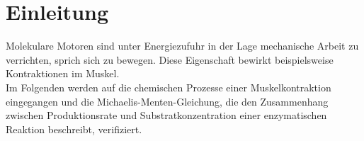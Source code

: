 \section{Einleitung}
Molekulare Motoren sind unter Energiezufuhr in der Lage mechanische Arbeit zu verrichten, sprich sich zu bewegen. Diese Eigenschaft bewirkt beispielsweise Kontraktionen im Muskel. \\
Im Folgenden werden auf die chemischen Prozesse einer Muskelkontraktion eingegangen und die Michaelis-Menten-Gleichung, die den Zusammenhang zwischen Produktionsrate und Substratkonzentration einer enzymatischen Reaktion beschreibt, verifiziert.

